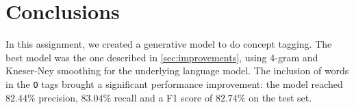 \section{Conclusions}
\label{sec:conclusions}

In this assignment, we created a generative model to do concept tagging.
The best model was the one described in \cref{sec:improvements}, using 4-gram and Kneser-Ney smoothing for the underlying language model.
The inclusion of words in the \texttt{O} tags brought a significant performance improvement:
the model reached $82.44\%$ precision, $83.04\%$ recall and a F1 score of $82.74\%$ on the test set.
